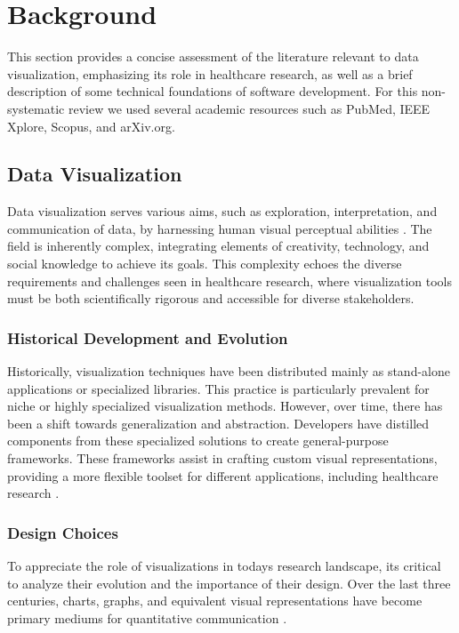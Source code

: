 \section{Background}\label{background}

This section provides a concise assessment of the literature relevant to
data visualization, emphasizing its role in healthcare research, as well
as a brief description of some technical foundations of software
development. For this non-systematic review we used several academic
resources such as PubMed, IEEE Xplore, Scopus, and arXiv.org.

\subsection{Data Visualization}\label{data-visualization}

Data visualization serves various aims, such as exploration,
interpretation, and communication of data, by harnessing human visual
perceptual abilities
\cite{5}. The field is
inherently complex, integrating elements of creativity, technology, and
social knowledge to achieve its goals. This complexity echoes the
diverse requirements and challenges seen in healthcare research, where
visualization tools must be both scientifically rigorous and accessible
for diverse stakeholders.

\subsubsection{Historical Development and
Evolution}\label{historical-development-and-evolution}

Historically, visualization techniques have been distributed mainly as
stand-alone applications or specialized libraries. This practice is
particularly prevalent for niche or highly specialized visualization
methods. However, over time, there has been a shift towards
generalization and abstraction. Developers have distilled components
from these specialized solutions to create general-purpose frameworks.
These frameworks assist in crafting custom visual representations,
providing a more flexible toolset for different applications, including
healthcare research \cite{5}.

\subsubsection{Design Choices}\label{design-choices}

To appreciate the role of visualizations in today\textquotesingle s
research landscape, it\textquotesingle s critical to analyze their
evolution and the importance of their design. Over the last three
centuries, charts, graphs, and equivalent visual representations have
become primary mediums for quantitative communication
\cite{6}.

